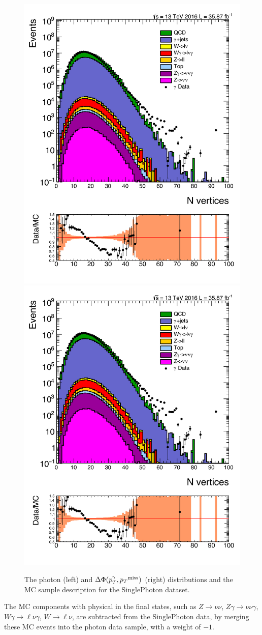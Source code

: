 \begin{figure}[htbp!]
\centering
\includegraphics[width=0.48\linewidth, page=7]{figures/ReMiniAODSummer16HLT_FixXsec_SepProc_PhPtWt_tight_puWeightsummer16_unblind_log_.pdf}
\includegraphics[width=0.48\linewidth, page=8]{figures/ReMiniAODSummer16HLT_FixXsec_SepProc_PhPtWt_tight_puWeightsummer16_unblind_log_.pdf}
\caption{The photon \ptmiss (left) and $\Delta \Phi (p_T ^\gamma ,{p_T}^\text{miss})$ (right) distributions and the MC sample description for the SinglePhoton dataset. }
\label{fig:pho_metpara}
\end{figure}

\vspace{0.3cm}
The MC components with physical \ptmiss in the final states, such as $Z\rightarrow\nu\nu$, $Z\gamma\rightarrow\nu\nu\gamma$, $W\gamma\rightarrow\ell\nu\gamma$, $W\rightarrow\ell\nu$, are subtracted from the SinglePhoton data, by merging these MC events into the photon data sample, with a weight of $-1$.

